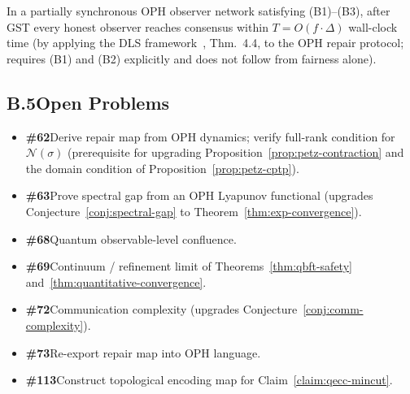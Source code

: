 \begin{theorem}
\label{thm:quantitative-convergence}
In a partially synchronous \textrm{OPH} observer network satisfying
(B1)--(B3), after \textrm{GST} every honest observer reaches consensus
within $T=O(f\cdot\Delta)$ wall-clock time
(by applying the \textrm{DLS} framework~\cite{DLS88}, Thm.~4.4,
to the \textrm{OPH} repair protocol;
requires (B1) and (B2) explicitly and does not follow from fairness alone).
\end{theorem}

\subsection*{B.5\quad Open Problems}

\begin{itemize}
  \item \textbf{\#62}\enspace Derive repair map from OPH dynamics;
        verify full-rank condition for $\mathcal{N}(\sigma)$
        (prerequisite for upgrading Proposition~\ref{prop:petz-contraction}
        and the domain condition of Proposition~\ref{prop:petz-cptp}).
  \item \textbf{\#63}\enspace Prove spectral gap from an OPH Lyapunov
        functional (upgrades Conjecture~\ref{conj:spectral-gap} to
        Theorem~\ref{thm:exp-convergence}).
  \item \textbf{\#68}\enspace Quantum observable-level confluence.
  \item \textbf{\#69}\enspace Continuum / refinement limit of
        Theorems~\ref{thm:qbft-safety} and~\ref{thm:quantitative-convergence}.
  \item \textbf{\#72}\enspace Communication complexity
        (upgrades Conjecture~\ref{conj:comm-complexity}).
  \item \textbf{\#73}\enspace Re-export repair map into OPH language.
  \item \textbf{\#113}\enspace Construct topological encoding map for
        Claim~\ref{claim:qecc-mincut}.
\end{itemize}

